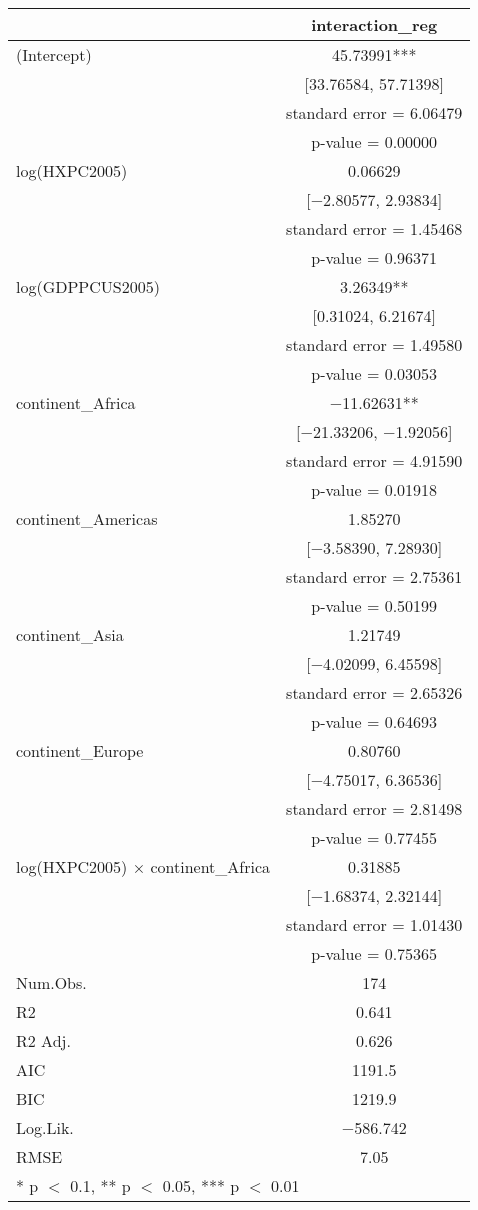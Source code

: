 \documentclass[
]{article}
\begin{document}
\begin{table}
\centering
\begin{tabular}[t]{lc}
\toprule
  & interaction\_reg\\
\midrule
(Intercept) & \num{45.73991}***\\
 & {}[\num{33.76584}, \num{57.71398}]\\
 & standard error = \num{6.06479}\\
 & p-value = \num{0.00000}\\
log(HXPC2005) & \num{0.06629}\\
 & {}[\num{-2.80577}, \num{2.93834}]\\
 & standard error = \num{1.45468}\\
 & p-value = \num{0.96371}\\
log(GDPPCUS2005) & \num{3.26349}**\\
 & {}[\num{0.31024}, \num{6.21674}]\\
 & standard error = \num{1.49580}\\
 & p-value = \num{0.03053}\\
continent\_Africa & \num{-11.62631}**\\
 & {}[\num{-21.33206}, \num{-1.92056}]\\
 & standard error = \num{4.91590}\\
 & p-value = \num{0.01918}\\
continent\_Americas & \num{1.85270}\\
 & {}[\num{-3.58390}, \num{7.28930}]\\
 & standard error = \num{2.75361}\\
 & p-value = \num{0.50199}\\
continent\_Asia & \num{1.21749}\\
 & {}[\num{-4.02099}, \num{6.45598}]\\
 & standard error = \num{2.65326}\\
 & p-value = \num{0.64693}\\
continent\_Europe & \num{0.80760}\\
 & {}[\num{-4.75017}, \num{6.36536}]\\
 & standard error = \num{2.81498}\\
 & p-value = \num{0.77455}\\
log(HXPC2005) × continent\_Africa & \num{0.31885}\\
 & {}[\num{-1.68374}, \num{2.32144}]\\
 & standard error = \num{1.01430}\\
 & p-value = \num{0.75365}\\
\midrule
Num.Obs. & \num{174}\\
R2 & \num{0.641}\\
R2 Adj. & \num{0.626}\\
AIC & \num{1191.5}\\
BIC & \num{1219.9}\\
Log.Lik. & \num{-586.742}\\
RMSE & \num{7.05}\\
\bottomrule
\multicolumn{2}{l}{\rule{0pt}{1em}* p $<$ 0.1, ** p $<$ 0.05, *** p $<$ 0.01}\\
\end{tabular}
\end{table}
\end{document}
